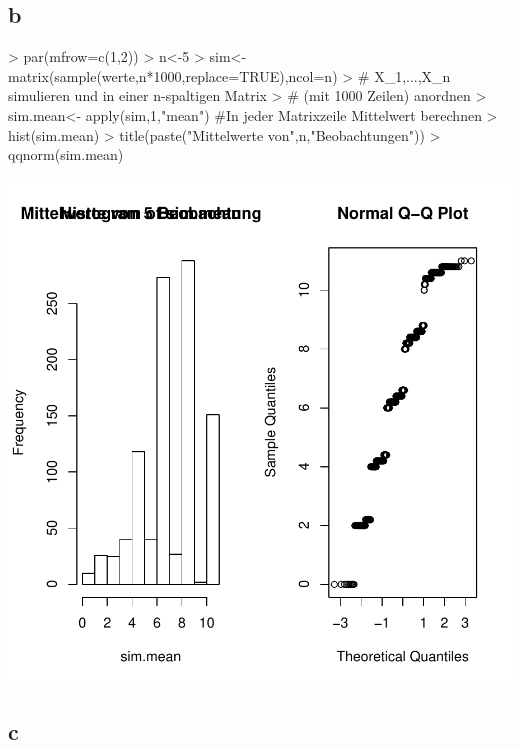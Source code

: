 \subsection{b}
\begin{Schunk}
\begin{Sinput}
> par(mfrow=c(1,2))
> n<-5
> sim<-matrix(sample(werte,n*1000,replace=TRUE),ncol=n)
> # X_1,...,X_n simulieren und in einer n-spaltigen Matrix
> # (mit 1000 Zeilen) anordnen
> sim.mean<- apply(sim,1,"mean") #In jeder Matrixzeile Mittelwert berechnen
> hist(sim.mean)
> title(paste("Mittelwerte von",n,"Beobachtungen"))
> qqnorm(sim.mean)
\end{Sinput}
\end{Schunk}
\includegraphics{sw08_4-002}

\subsection{c}

